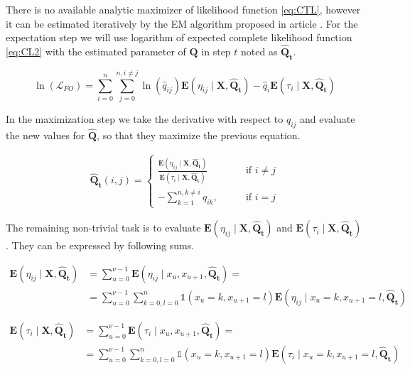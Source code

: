 \documentclass[thesis=M,english]{FITthesis}[2012/10/20]
\newcommand{\matr}[1]{\mathbf{#1}}
\begin{document}
There is no available analytic maximizer of likelihood function \eqref{eq:CTL}, however it can be estimated iteratively by the EM algorithm proposed in article \cite{Me07}.  
For the expectation step we will use logarithm of expected complete likelihood function \eqref{eq:CL2} with the estimated parameter of $\matr{Q}$ in step $t$ noted as $\matr{ \hat Q_t } $.

\begin{equation}\label{eq:EMCL}
 \ln( \mathcal{L}_{FO} ) = \sum_{i=0}^n \sum_{j=0}^{n, i \neq j} \ln( \hat q_{ij}) \mathbf{E}( \eta_{ij} \mid \matr{X}, \matr{ \hat Q_t } ) - \hat q_i \mathbf{E}( \tau_i \mid \matr{X}, \matr{ \hat Q_t } )
\end{equation}

In the maximization step we take the derivative with respect to $q_{ij}$ and evaluate the new values for $\matr{ \hat Q }$, so that they maximize the previous equation. 

\begin{equation}\label{eq:Qmax}
\begin{aligned}  
\matr{ \hat Q_t }(i,j)= 
\begin{cases}
\frac{ \mathbf{E}(\eta_{ij} \mid \matr{X}, \matr{ \hat Q_t } )}{ \mathbf{E}( \tau_i \mid \matr{X}, \matr{\hat Q_t} ) } & \text{if } i\neq j\\
- \sum\limits_{k=1}^{n,k \neq i} q_{ik}, \qquad & \text{if } i=j
\end{cases}
\end{aligned}
\end{equation}

The remaining non-trivial task is to evaluate $\mathbf{E}( \eta_{ij} \mid \matr{X}, \matr{\hat Q_t} )$ and $\mathbf{E}( \tau_i \mid \matr{X}, \matr{ \hat Q_t } )$. They can be expressed by following sums.


\begin{equation}
\begin{aligned}  
\mathbf{E}(\eta_{ij} \mid \matr{X}, \matr{\hat Q_t} ) &= \sum_{u=0}^{\nu-1} \mathbf{E}(\eta_{ij} \mid x_u, x_{u+1}, \matr{ \hat Q_t } ) = \\
&= \sum_{u=0}^{\nu-1} \sum_{k=0,l=0}^{n} \mathds{1}( x_u = k, x_{u+1} = l ) \mathbf{E}(\eta_{ij} \mid x_u = k, x_{u+1} = l, \matr{\hat Q_t} )
\end{aligned}
\end{equation}


\begin{equation}
\begin{aligned}  
\mathbf{E}( \tau_i \mid \matr{X}, \matr{\hat Q_t} ) &= \sum_{u=0}^{\nu-1} \mathbf{E}(\tau_i \mid x_u, x_{u+1}, \matr{ \hat Q_t } ) = \\
&= \sum_{u=0}^{\nu-1} \sum_{k=0,l=0}^{n} \mathds{1}( x_u = k, x_{u+1} = l ) \mathbf{E}(\tau_i \mid x_u = k, x_{u+1} = l, \matr{\hat Q_t} )
\end{aligned}
\end{equation}
   
\end{document}
